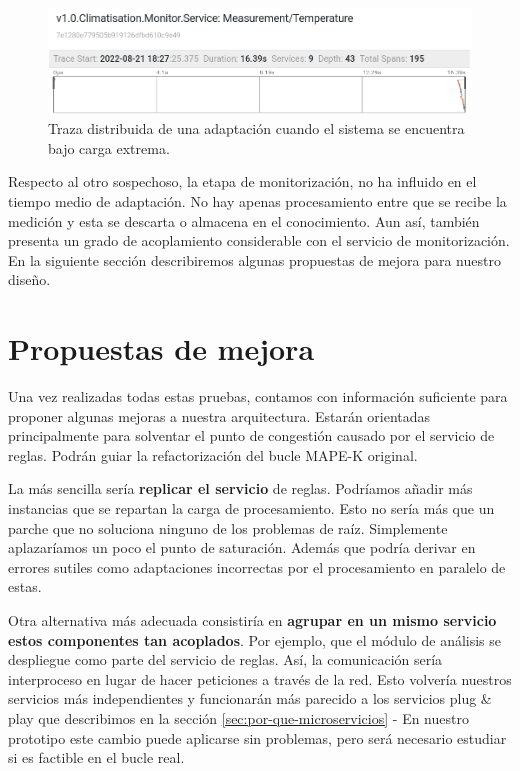 \begin{figure}[htb]
  \hspace{-0.2cm}
  \includegraphics[scale=0.45]{cap_despliegue/images/pruebas-carga-traza}
  \caption{Traza distribuida de una adaptación cuando el sistema se encuentra bajo carga extrema.}
  \label{fig:prueba-carga-traza}
\end{figure}

Respecto al otro sospechoso, la etapa de monitorización, no ha influido en el tiempo medio de adaptación. No hay apenas procesamiento entre que se recibe la medición y esta se descarta o almacena en el conocimiento. Aun así, también presenta un grado de acoplamiento considerable con el servicio de monitorización. En la siguiente sección describiremos algunas propuestas de mejora para nuestro diseño.

\section{Propuestas de mejora}

Una vez realizadas todas estas pruebas, contamos con información suficiente para proponer algunas mejoras a nuestra arquitectura. Estarán orientadas principalmente para solventar el punto de congestión causado por el servicio de reglas. Podrán guiar la refactorización del bucle MAPE-K  original.

La más sencilla sería \textbf{replicar el servicio} de reglas. Podríamos añadir más instancias que se repartan la carga de procesamiento. Esto no sería más que un parche que no soluciona ninguno de los problemas de raíz. Simplemente aplazaríamos un poco el punto de saturación. Además que podría derivar en errores sutiles como adaptaciones incorrectas por el procesamiento en paralelo de estas.

Otra alternativa más adecuada consistiría en \textbf{agrupar en un mismo servicio estos componentes tan acoplados}. Por ejemplo, que el módulo de análisis se despliegue como parte del servicio de reglas. Así, la comunicación sería interproceso en lugar de hacer peticiones a través de la red. Esto volvería nuestros servicios más independientes y funcionarán más parecido a los servicios plug \& play que describimos en la sección \ref{sec:por-que-microservicios} -  En nuestro prototipo este cambio puede aplicarse sin problemas, pero será necesario estudiar si es factible en el bucle real.

